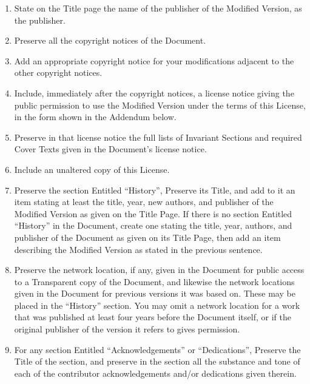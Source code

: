 \begin{enumerate}
\begin{enumerate}
  \item
    State on the Title page the name of the publisher of the Modified Version, as the publisher.

  \item
    Preserve all the copyright notices of the Document.

  \item
    Add an appropriate copyright notice for your modifications adjacent to the other copyright
    notices.

  \item
    Include, immediately after the copyright notices, a license notice giving the public
    permission to use the Modified Version under the terms of this License, in the form shown in
    the Addendum below.

  \item
    Preserve in that license notice the full lists of Invariant Sections and required Cover
    Texts given in the Document's license notice.

  \item
    Include an unaltered copy of this License.

  \item
    Preserve the section Entitled ``History'', Preserve its Title, and add to it an item stating
    at least the title, year, new authors, and publisher of the Modified Version as given on the
    Title Page.  If there is no section Entitled ``History'' in the Document, create one stating
    the title, year, authors, and publisher of the Document as given on its Title Page, then add
    an item describing the Modified Version as stated in the previous sentence.

  \item
    Preserve the network location, if any, given in the Document for public access to a
    Transparent copy of the Document, and likewise the network locations given in the Document
    for previous versions it was based on.  These may be placed in the ``History'' section.  You
    may omit a network location for a work that was published at least four years before the
    Document itself, or if the original publisher of the version it refers to gives permission.

  \item
    For any section Entitled ``Acknowledgements'' or ``Dedications'', Preserve the Title of the
    section, and preserve in the section all the substance and tone of each of the contributor
    acknowledgements and/or dedications given therein.


\end{enumerate}
\end{enumerate}

